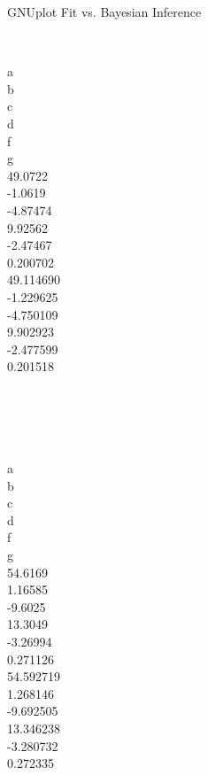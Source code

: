 \documentclass[10pt]{beamer}
\begin{document}
\begin{frame}{GNUplot Fit vs. Bayesian Inference}
	\vspace{-3mm}
	 \\
	\begin{columns}[c]
		 \\
		a \\
		b \\
		c \\
		d \\
		f \\
		g  
		 \\
		49.0722 \\
		-1.0619 \\
		-4.87474 \\
		9.92562 \\
		-2.47467 \\
		0.200702 
		 \\
		49.114690 \\
		-1.229625 \\
		-4.750109 \\
		9.902923 \\
		-2.477599 \\
		0.201518
	\end{columns}
	\newline
 	\newline
	\vspace{4mm}
	 \\
	\begin{columns}[c]
		 \\
		a \\
		b \\
		c \\
		d \\
		f \\
		g  
		 \\
		54.6169 \\
		1.16585 \\
		-9.6025 \\
		13.3049 \\
		-3.26994 \\
		0.271126 
		 \\
		54.592719 \\
		1.268146 \\
		-9.692505 \\
		13.346238 \\
		-3.280732 \\
		0.272335
	\end{columns}
\end{frame}
\end{document}
